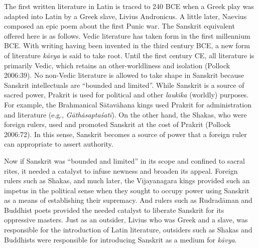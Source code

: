 The first written literature in Latin is traced to 240 BCE when a Greek play was adapted into Latin by a Greek slave, Livius Andronicus. A little later, Naevius
 composed an epic poem about the first Punic war. The Sanskrit equivalent offered here is as follows. Vedic literature has taken form in the first millennium BCE. With writing having been invented in the third century BCE, a new form of literature {\sl kāvya} is said to take root. Until the first century CE, all literature is primarily Vedic, which retains an other-worldliness and isolation (Pollock 2006:39). No non-Vedic literature is allowed to take shape in Sanskrit because Sanskrit intellectuals are “bounded and limited”. While Sanskrit is a source of sacred power, Prakrit is used for political and other {\sl laukika} (worldly) purposes. For example, the Brahmanical Sātavāhana kings used Prakrit for administration and literature (e.g., {\sl Gāthāsaptaśatī}). On the other hand, the Shakas, who were foreign rulers, used and promoted Sanskrit at the cost of Prakrit (Pollock 2006:72). In this sense, Sanskrit becomes a source of power that a foreign ruler can appropriate to assert authority.

Now if Sanskrit was “bounded and limited” in its scope and confined to sacral rites, it needed a catalyst to infuse newness and broaden its appeal. Foreign rulers such as Shakas, and much later, the Vijayanagara kings provided such an impetus in the political sense when they sought to occupy power using Sanskrit as a means of establishing their supremacy. And rulers such as Rudradāman and Buddhist poets provided the needed catalyst to liberate Sanskrit for its oppressive masters. Just as an outsider, Livius who was Greek and a slave, was responsible for the introduction of Latin literature, outsiders such as Shakas and Buddhists were responsible for introducing Sanskrit as a medium for {\sl kāvya}.

